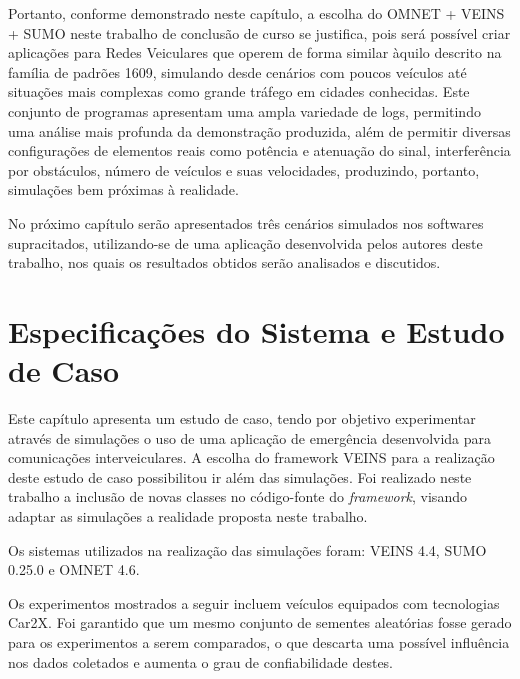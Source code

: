 \documentclass[
12pt,				%
openright,			%
oneside,			%
a4paper,			%
brazil,				%
]{abntex2}
\begin{document}
	\newpage
	
	\par Portanto, conforme demonstrado neste capítulo, a escolha do OMNET + VEINS + SUMO neste trabalho de conclusão de curso se justifica, pois será possível criar aplicações para Redes Veiculares que operem de forma similar àquilo descrito na família de padrões 1609, simulando desde cenários com poucos veículos até situações mais complexas como grande tráfego em cidades conhecidas. Este conjunto de programas apresentam uma ampla variedade de logs, permitindo uma análise mais profunda da demonstração produzida, além de permitir diversas configurações de elementos reais como potência e atenuação do sinal, interferência por obstáculos, número de veículos e suas velocidades, produzindo, portanto, simulações bem próximas à realidade.
	
	\par No próximo capítulo serão apresentados três cenários simulados nos softwares supracitados, utilizando-se de uma aplicação desenvolvida pelos autores deste trabalho, nos quais os resultados obtidos serão analisados e discutidos.


	\newpage
	\chapter{Especificações do Sistema e Estudo de Caso}

	\par Este capítulo apresenta um estudo de caso, tendo por objetivo experimentar através de simulações o uso de uma aplicação de emergência desenvolvida para comunicações interveiculares. A escolha do framework VEINS para a realização deste estudo de caso possibilitou ir além das simulações. Foi realizado neste trabalho a inclusão de novas classes no código-fonte do \textit{framework}, visando adaptar as simulações a realidade proposta neste trabalho.

	\par Os sistemas utilizados na realização das simulações foram: VEINS 4.4, SUMO 0.25.0 e OMNET 4.6.

	\par Os experimentos mostrados a seguir incluem veículos equipados com tecnologias Car2X. Foi garantido que um mesmo conjunto de sementes aleatórias fosse gerado para os experimentos a serem comparados, o que descarta uma possível influência nos dados coletados e aumenta o grau de confiabilidade destes.
\end{document}
